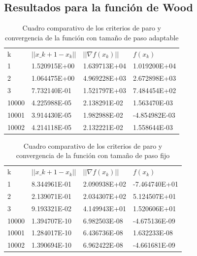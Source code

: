 \documentclass[journal]{IEEEtran}
\begin{document}
\subsection{}

\subsection{Resultados para la función de Wood}

\begin{table}[H]
\begin{tabular}{@{}llll@{}}
k & $||x\_{k+1}-x_k||$ & $||\nabla f(x_k)||$ & $f(x_k)$ \\
1  &  1.520915E+00 &  1.639713E+04   &  1.019200E+04  \\
2  &  1.064475E+00 &  4.969228E+03   &  2.672898E+03  \\
3  &  7.732140E-01 &  1.521797E+03   &  7.484454E+02  \\
10000  &  4.225988E-05 &  2.138291E-02   &  1.563470E-03 \\
10001  &  3.914430E-05 &  1.982988E-02   &  -4.854982E-03  \\
10002  &  4.214118E-05 &  2.132221E-02   &  1.558644E-03
\end{tabular}
\caption{Cuadro comparativo de los criterios de paro y convergencia de la función con tamaño de paso adaptable}
\end{table}

\begin{table}[H]
\begin{tabular}{@{}llll@{}}
k & $||x\_{k+1}-x_k||$ & $||\nabla f(x_k)||$ & $f(x_k)$ \\
1  &  8.344961E-01 &  2.090938E+02   &  -7.464740E+01  \\
2  &  2.139071E-01 &  2.034307E+02   &  5.124507E+01  \\
3  &  9.193321E-02 &  4.149943E+01   &  1.520606E+01  \\
10000  &  1.394707E-10 &  6.982503E-08   &  -4.675136E-09 \\
10001  &  1.284017E-10 &  6.436736E-08   &  1.632233E-08  \\
10002  &  1.390694E-10 &  6.962422E-08   &  -4.661681E-09
\end{tabular}
\caption{Cuadro comparativo de los criterios de paro y convergencia de la función con tamaño de paso fijo}
\end{table}
\end{document}
